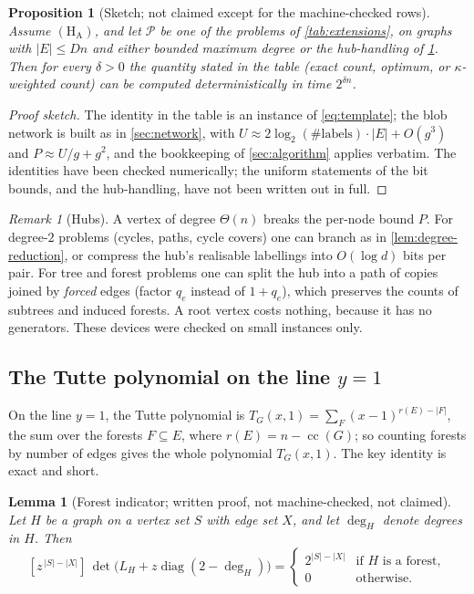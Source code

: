 \documentclass[11pt]{amsart}
\theoremstyle{plain}
\newtheorem{lemma}[theorem]{Lemma}
\newtheorem{proposition}[theorem]{Proposition}
\theoremstyle{definition}
\theoremstyle{remark}
\newtheorem{remark}[theorem]{Remark}
\numberwithin{equation}{section}
\newcommand{\cc}{\operatorname{cc}}
\begin{document}
\begin{proposition}[Sketch; not claimed except for the machine-checked rows]\label{prop:extensions}
Assume $(\mathrm{H}_{\mathrm{A}})$, and let $\mathcal P$ be one of the problems of
\cref{tab:extensions}, on graphs with $|E|\le Dn$ and either bounded maximum degree or the
hub-handling of \cref{rem:hubs}. Then for every $\delta>0$ the quantity stated in the table
(exact count, optimum, or $\kappa$-weighted count) can be computed deterministically in time
$2^{\delta n}$.
\end{proposition}

\begin{proof}[Proof sketch]
The identity in the table is an instance of \eqref{eq:template}; the blob network is built as in
\cref{sec:network}, with $U\approx 2\log_2(\#\text{labels})\cdot|E|+O(g^3)$ and $P\approx U/g+g^2$,
and the bookkeeping of \cref{sec:algorithm} applies verbatim. The identities have been checked
numerically; the uniform statements of the bit bounds, and the hub-handling, have not been written
out in full.
\end{proof}

\begin{remark}[Hubs]\label{rem:hubs}
A vertex of degree $\Theta(n)$ breaks the per-node bound $P$. For degree-$2$ problems (cycles,
paths, cycle covers) one can branch as in \cref{lem:degree-reduction}, or compress the hub's
realisable labellings into $O(\log d)$ bits per pair. For tree and forest problems one can split
the hub into a path of copies joined by \emph{forced} edges (factor $q_e$ instead of $1+q_e$),
which preserves the counts of subtrees and induced forests. A root vertex costs nothing, because
it has no generators. These devices were checked on small instances only.
\end{remark}

\subsection{The Tutte polynomial on the line \texorpdfstring{$y=1$}{y=1}}
On the line $y=1$, the Tutte polynomial is $T_G(x,1)=\sum_{F}(x-1)^{r(E)-|F|}$, the sum over the
forests $F\subseteq E$, where $r(E)=n-\cc(G)$; so counting forests by number of edges gives the
whole polynomial $T_G(x,1)$. The key identity is exact and short.

\begin{lemma}[Forest indicator; written proof, not machine-checked, not claimed]\label{lem:forest}
Let $H$ be a graph on a vertex set $S$ with edge set $X$, and let $\deg_H$ denote degrees in $H$.
Then
\[
  [z^{\,|S|-|X|}]\,\det\bigl(L_H+z\operatorname{diag}(2-\deg_H)\bigr)=
  \begin{cases}2^{|S|-|X|}&\text{if $H$ is a forest},\\ 0&\text{otherwise.}\end{cases}
\]
\end{lemma}
\end{document}
